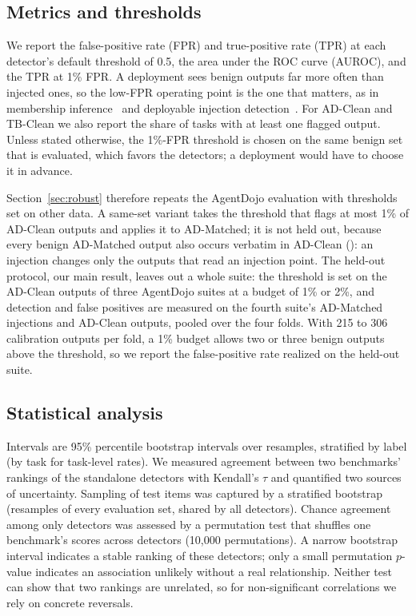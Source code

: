 \subsection{Metrics and thresholds}
We report the false-positive rate (FPR) and true-positive rate (TPR) at each detector's default threshold of 0.5, the area under the ROC curve (AUROC), and the TPR at 1\% FPR. A deployment sees benign outputs far more often than injected ones, so the low-FPR operating point is the one that matters, as in membership inference~\cite{lira} and deployable injection detection~\cite{promptshield}. For AD-Clean and TB-Clean we also report the share of tasks with at least one flagged output. Unless stated otherwise, the 1\%-FPR threshold is chosen on the same benign set that is evaluated, which favors the detectors; a deployment would have to choose it in advance.

Section~\ref{sec:robust} therefore repeats the AgentDojo evaluation with thresholds set on other data. A same-set variant takes the threshold that flags at most 1\% of AD-Clean outputs and applies it to AD-Matched; it is not held out, because every benign AD-Matched output also occurs verbatim in AD-Clean (\AdMatchedBenignInClean): an injection changes only the outputs that read an injection point. The held-out protocol, our main result, leaves out a whole suite: the threshold is set on the AD-Clean outputs of three AgentDojo suites at a budget of 1\% or 2\%, and detection and false positives are measured on the fourth suite's AD-Matched injections and AD-Clean outputs, pooled over the four folds. With 215 to 306 calibration outputs per fold, a 1\% budget allows two or three benign outputs above the threshold, so we report the false-positive rate realized on the held-out suite.

\subsection{Statistical analysis}
Intervals are 95\% percentile bootstrap intervals over \NBoot resamples, stratified by label (by task for task-level rates). We measured agreement between two benchmarks' rankings of the \NDetectors standalone detectors with Kendall's $\tau$ and quantified two sources of uncertainty. Sampling of test items was captured by a stratified bootstrap (\NBoot resamples of every evaluation set, shared by all detectors). Chance agreement among only \NDetectors detectors was assessed by a permutation test that shuffles one benchmark's scores across detectors (10{,}000 permutations). A narrow bootstrap interval indicates a stable ranking of these detectors; only a small permutation $p$-value indicates an association unlikely without a real relationship. Neither test can show that two rankings are unrelated, so for non-significant correlations we rely on concrete reversals.
